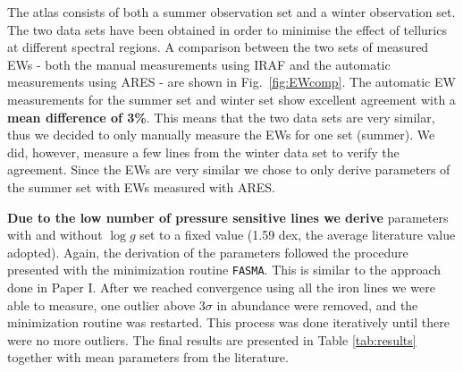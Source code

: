\documentclass{aa}
\begin{document}
The atlas consists of both a summer observation set and a winter observation
set. The two data sets have been obtained in order to minimise the effect of
tellurics at different spectral regions. A comparison between the two sets of
measured EWs - both the manual measurements using IRAF and the automatic
measurements using ARES - are shown in Fig.~\ref{fig:EWcomp}. The automatic EW
measurements for the summer set and winter set show excellent agreement
with a {\bf mean difference of 3\%}. This means that the two data sets are very
similar, thus we decided to only manually measure the EWs for one set (summer).
We did, however, measure a few lines from the winter data set to verify the
agreement. Since the EWs are very similar we chose to only derive
parameters of the summer set with EWs measured with ARES.

{\bf Due to the low number of pressure sensitive  lines we derive} parameters with and
without $\log g$ set to a fixed value (1.59 dex, the average literature value adopted). Again, the
derivation of the parameters followed the procedure presented \citet{Andreasen2017a} with the
minimization routine \texttt{FASMA}. This is similar to the approach done in Paper I. After we
reached convergence using all the iron lines we were able to measure, one outlier above $3\sigma$ in
abundance were removed, and the minimization routine was restarted. This process was done
iteratively until there were no more outliers. The final results are presented in Table
\ref{tab:results} together with mean parameters from the literature.
\end{document}
